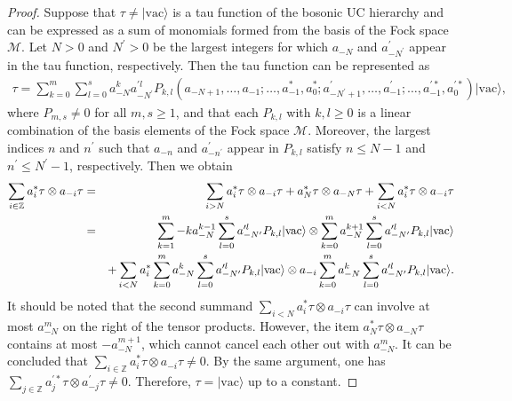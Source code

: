 \documentclass[11pt,reqno]{amsart}
\numberwithin{equation}{section}
\begin{document}
\begin{proof}
Suppose that $\tau\neq|\text{vac}\rangle$ is a tau function of the bosonic UC hierarchy  and can be expressed as a sum of monomials formed from the basis of the Fock space $\mathcal{M}$. Let $N>0$ and $N^{\prime}>0$ be the largest integers for which $a_{-N}$ and $a^{\prime}_{-N^{\prime}}$ appear in the tau function, respectively. Then the tau function can be represented as
\begin{eqnarray}
\tau=\sum\limits^{m}_{k=0}\sum\limits^{s}_{l=0}a^{k}_{-N}a^{\prime l}_{-N^{\prime}}P_{k,l}(a_{-N+1},\ldots,a_{-1};\ldots,a^{\ast}_{-1},a^{\ast}_{0};
a^{\prime}_{-N^{\prime}+1},\ldots,a^{\prime}_{-1};\ldots,a^{\prime\ast}_{-1},
a^{\prime\ast}_{0})|\text{vac}\rangle,
\end{eqnarray}
where $P_{m,s}\neq0$ for all $m,s\geq1$, and that each $P_{k,l}$ with $k,l\geq0$ is a  linear combination of the basis elements of the Fock space $\mathcal{M}$. Moreover, the largest indices $n$ and $n^{\prime}$ such that $a_{-n}$ and $a^{\prime}_{-n^{\prime}}$ appear in $P_{k,l}$  satisfy $n\leq N-1$ and $n^{\prime}\leq N^{\prime}-1$, respectively. Then we obtain
\begin{eqnarray}
\sum\limits_{i\in\mathbb{Z}}a^{\ast}_{i}\tau\otimes a_{-i}\tau&=&\sum\limits_{i>N}a^{\ast}_{i}\tau\otimes a_{-i}\tau+a^{\ast}_{N}\tau\otimes a_{-N}\tau+\sum\limits_{i<N}a^{\ast}_{i}\tau\otimes a_{-i}\tau\notag\\
&=&\sum\limits^{m}_{k=1}-ka^{k-1}_{-N}\sum\limits^{s}_{l=0}a^{\prime l}_{-N^{\prime}}P_{k,l}|\text{vac}\rangle\otimes\sum\limits^{m}_{k=0}a^{k+1}_{-N}
\sum\limits^{s}_{l=0}a^{\prime l}_{-N^{\prime}}P_{k,l}|\text{vac}\rangle\notag\\
&&+\sum\limits_{i<N}a^{\ast}_{i}\sum\limits^{m}_{k=0}a^{k}_{-N}\sum\limits^{s}_{l=0}
a^{\prime l}_{-N^{\prime}}P_{k,l}|\text{vac}\rangle\otimes a_{-i}\sum\limits^{m}_{k=0}a^{k}_{-N}\sum\limits^{s}_{l=0}
a^{\prime l}_{-N^{\prime}}P_{k,l}|\text{vac}\rangle.
\end{eqnarray}
It should be noted that the second summand $\sum\limits_{i<N}a^{\ast}_{i}\tau\otimes a_{-i}\tau$ can involve at most $a^{m}_{-N}$ on the right of the tensor products. However, the item $a^{\ast}_{N}\tau\otimes a_{-N}\tau$ contains at most $-a^{m+1}_{-N}$, which cannot cancel each other out with $a^{m}_{-N}$. It can be concluded that $\sum\limits_{i\in\mathbb{Z}}a^{\ast}_{i}\tau\otimes a_{-i}\tau\neq0$. By the same argument, one has $\sum\limits_{j\in\mathbb{Z}}a^{\prime\ast}_{j}\tau\otimes a^{\prime}_{-j}\tau\neq0$. Therefore, $\tau=|\text{vac}\rangle$ up to a constant.
\end{proof}
\end{document}
